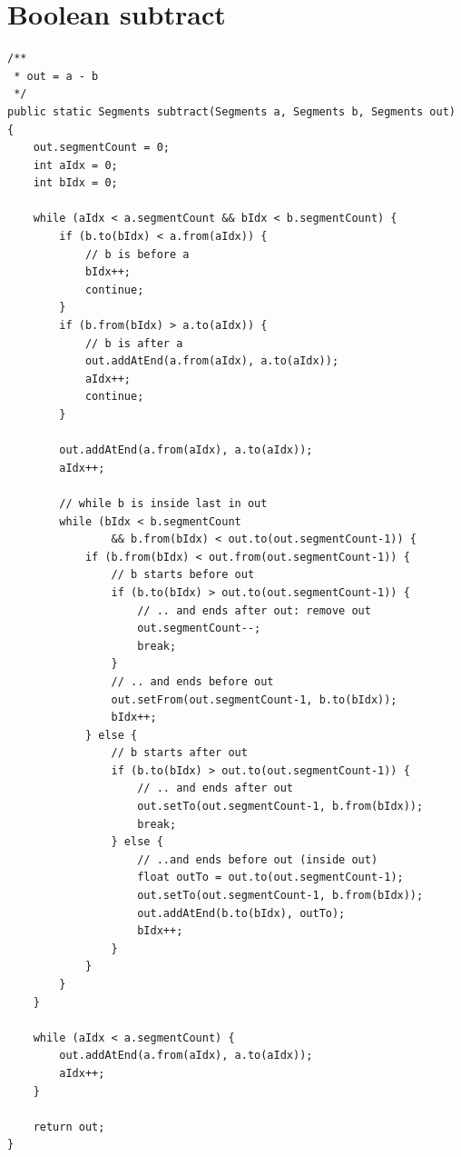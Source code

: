 \documentclass[11pt,twoside,a4paper]{report}
\begin{document}
\section{Boolean subtract}
\label{source:unite}
\begin{lstlisting}
/**
 * out = a - b
 */
public static Segments subtract(Segments a, Segments b, Segments out) {
    out.segmentCount = 0;
    int aIdx = 0;
    int bIdx = 0;

    while (aIdx < a.segmentCount && bIdx < b.segmentCount) {
        if (b.to(bIdx) < a.from(aIdx)) {
            // b is before a
            bIdx++;
            continue;
        }
        if (b.from(bIdx) > a.to(aIdx)) {
            // b is after a
            out.addAtEnd(a.from(aIdx), a.to(aIdx));
            aIdx++;
            continue;
        }

        out.addAtEnd(a.from(aIdx), a.to(aIdx));
        aIdx++;

        // while b is inside last in out
        while (bIdx < b.segmentCount 
        		&& b.from(bIdx) < out.to(out.segmentCount-1)) {
            if (b.from(bIdx) < out.from(out.segmentCount-1)) {
                // b starts before out
                if (b.to(bIdx) > out.to(out.segmentCount-1)) {
                    // .. and ends after out: remove out
                    out.segmentCount--;
                    break;
                }
                // .. and ends before out
                out.setFrom(out.segmentCount-1, b.to(bIdx));
                bIdx++;
            } else {
                // b starts after out
                if (b.to(bIdx) > out.to(out.segmentCount-1)) {
                    // .. and ends after out
                    out.setTo(out.segmentCount-1, b.from(bIdx));
                    break;
                } else {
                    // ..and ends before out (inside out)
                    float outTo = out.to(out.segmentCount-1);
                    out.setTo(out.segmentCount-1, b.from(bIdx));
                    out.addAtEnd(b.to(bIdx), outTo);
                    bIdx++;
                }
            }
        }
    }

    while (aIdx < a.segmentCount) {
        out.addAtEnd(a.from(aIdx), a.to(aIdx));
        aIdx++;
    }

    return out;
}
\end{lstlisting}
\end{document}
